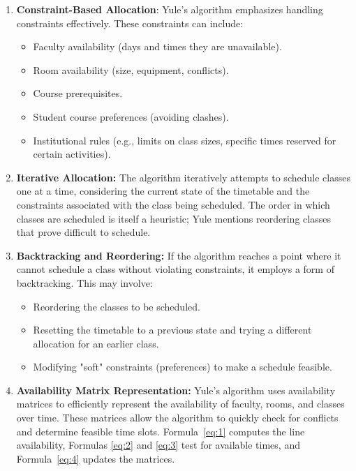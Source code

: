\begin{enumerate}
    \item \textbf{Constraint-Based Allocation}: Yule's algorithm emphasizes handling constraints effectively.
	These constraints can include:
    \begin{itemize}
        \item Faculty availability (days and times they are unavailable).
        \item Room availability (size, equipment, conflicts).
        \item Course prerequisites.
        \item Student course preferences (avoiding clashes).
        \item Institutional rules (e.g., limits on class sizes, specific times reserved for certain activities).
    \end{itemize}

    \item \textbf{Iterative Allocation:} The algorithm iteratively attempts to schedule classes one at a time, considering the current state of the timetable and the constraints associated with the class being scheduled.
	The order in which classes are scheduled is itself a heuristic; Yule mentions reordering classes that prove difficult to schedule.

    \item \textbf{Backtracking and Reordering:} If the algorithm reaches a point where it cannot schedule a class without violating constraints, it employs a form of backtracking.
	This may involve:
    \begin{itemize}
        \item Reordering the classes to be scheduled.
        \item Resetting the timetable to a previous state and trying a different allocation for an earlier class.
        \item Modifying "soft" constraints (preferences) to make a schedule feasible.
    \end{itemize}

    \item \textbf{Availability Matrix Representation:} Yule's algorithm uses availability matrices to efficiently represent the availability of faculty, rooms, and classes over time.
	These matrices allow the algorithm to quickly check for conflicts and determine feasible time slots.
	Formula~\ref{eq:1} computes the line availability, Formulas \ref{eq:2} and \ref{eq:3} test for available times, and Formula~\ref{eq:4} updates the matrices.


\end{enumerate}
